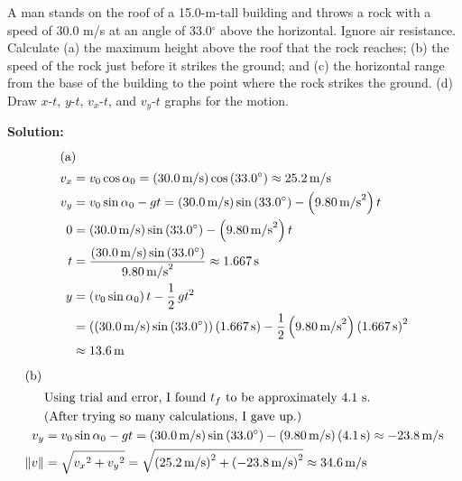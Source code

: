 \documentclass[12pt]{article}
\newenvironment{problem}[2][]{
    \begin{trivlist}
        \item[
            {\bfseries #1}
            {\bfseries #2}
        ]
}{\end{trivlist}}
\newcommand{\solution}{\medskip\noindent\textbf{Solution:}}
\newcommand{\Part}[1]{\shortintertext{(#1)}}
\newcommand{\magnitude}[1]{\lVert #1 \rVert}
\newcommand{\unit}[1]{\, \text{#1}}
\newcommand{\m}{\unit{m}}
\newcommand{\mps}{\unit{m/s}}
\newcommand{\s}{\unit{s}}
\begin{document}
\begin{problem}{3.21}
    A man stands on the roof of a 15.0-m-tall building and throws a rock with a speed of 30.0 m/s at an angle of 33.0$^\circ$ above the horizontal.
    Ignore air resistance.
    Calculate
    (a) the maximum height above the roof that the rock reaches;
    (b) the speed of the rock just before it strikes the ground; and
    (c) the horizontal range from the base of the building to the point where the rock strikes the ground.
    (d) Draw $x$-$t$, $y$-$t$, $v_x$-$t$, and $v_y$-$t$ graphs for the motion.

    \solution
    \begin{align}
        \Part{a}
        v_x &= v_0 \cos{\alpha_0} = \left(30.0 \mps\right) \cos{\left(33.0^\circ\right)} \approx 25.2 \mps \\
        v_y &= v_0 \sin{\alpha_0} - gt = \left(30.0 \mps\right) \sin{\left(33.0^\circ\right)} - \left(9.80 \mps^2\right) t \\
        0 &= \left(30.0 \mps\right) \sin{\left(33.0^\circ\right)} - \left(9.80 \mps^2\right) t \\
        t &= \frac{\left(30.0 \mps\right) \sin{\left(33.0^\circ\right)}}{9.80 \mps^2} \approx 1.667 \s \\
        y &= \left(v_0 \sin{\alpha_0}\right) t - \frac{1}{2} \, gt^2 \\
        &= \left(\left(30.0 \mps\right) \sin{\left(33.0^\circ\right)}\right) \left(1.667 \s\right)  - \frac{1}{2} \left(9.80 \mps^2\right) \left(1.667 \s\right)^2 \\
        &\approx 13.6 \m
    \end{align}
    \begin{align}
        \Part{b}
        &\text{Using trial and error, I found } t_f \text{ to be approximately 4.1 s. } \notag \\
        &\text{(After trying so many calculations, I gave up.)} \notag \\
        v_y &= v_0 \sin{\alpha_0} - gt = \left(30.0 \mps\right) \sin{\left(33.0^\circ\right)} - \left(9.80 \mps\right) \left(4.1 \s\right) \approx -23.8 \mps \\
        \magnitude{v} &= \sqrt{{v_x}^2 + {v_y}^2} = \sqrt{\left(25.2 \mps\right)^2 + \left(-23.8 \mps\right)^2} \approx 34.6 \mps

\end{align}
\end{problem}
\end{document}
